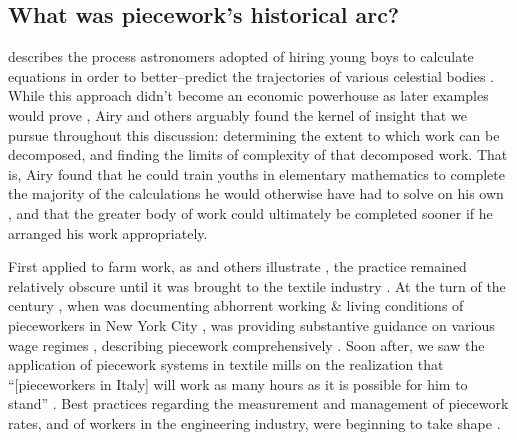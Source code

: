 \documentclass[trackingWork]{subfiles}
\begin{document}
\subsection{What was piecework's historical arc?}

\citeauthor{grier2013computers} describes the process astronomers adopted of hiring young boys
to calculate equations in order to better--predict the trajectories of various celestial bodies
\cite{grier2013computers}. 
While this approach didn't become an economic powerhouse as later examples would prove%
, Airy and others arguably found the kernel of insight that we pursue throughout this discussion:
determining the extent to which work can be decomposed, and
finding the limits of complexity of that decomposed work.
That is, Airy found that he could train youths in elementary mathematics
to complete the majority of the calculations he would otherwise have had to solve on his own%
, and that the greater body of work could ultimately be completed sooner
if he arranged his work appropriately.

 
First applied to farm work, as
\citeauthor{hughRaynbirdTaskWork} and others illustrate%
, the practice remained relatively obscure until
it was brought to the textile industry
\cite{hughRaynbirdTaskWork}.
At the turn of the  century%
, when \citeauthor{riisOtherSideLives} was documenting abhorrent working \& living conditions of pieceworkers in New York City%
, \citeauthor{norton1900textile} was providing substantive guidance on various wage regimes%
, describing piecework comprehensively 
\cite{riisOtherSideLives,norton1900textile}.
Soon after,
we saw the application of piecework systems in textile mills on the realization that
``[pieceworkers in Italy] will work as many hours as it is possible for him to stand''
\cite{clark1908cotton}.
Best practices regarding the measurement and management of
piecework rates, and of workers in the engineering industry,
were beginning to take shape
\cite{burton1899commercial}.
\end{document}
